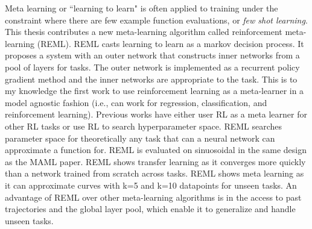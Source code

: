 \noindent Meta learning or ``learning to learn" is often applied to training under the 
constraint where there are few example function evaluations, or \textit{few shot
learning}. 
This thesis contributes a new meta-learning algorithm called reinforcement meta-learning
(REML). 
REML casts learning to learn as a markov decision process.
It proposes a system with an outer network that constructs inner networks 
from a pool of layers for tasks. 
The outer network is implemented as a recurrent policy gradient method and the 
inner networks are appropriate to the task.
This is to my knowledge the first work to use reinforcement learning as a meta-learner
in a model agnostic fashion (i.e., can work for regression, classification, and 
reinforcement learning). Previous works have either user RL as a meta learner for other
RL tasks or use RL to search hyperparameter space. REML searches parameter space for
theoretically any task that can a neural network can approximate a function for.
REML is evaluated on sinuosoidal in the same design as the MAML paper. 
REML shows transfer learning as it converges more quickly than a network trained 
from scratch across tasks. 
REML shows meta learning as it can approximate curves with k=5 and k=10 datapoints 
for unseen tasks. 
An advantage of REML over other meta-learning algorithms is in the access
to past trajectories and the global layer pool, which enable it to generalize and handle
unseen tasks.
\clearpage